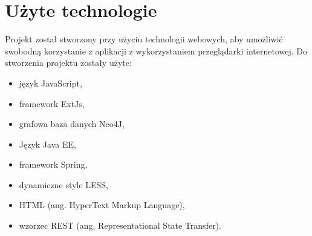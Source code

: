 \section{Użyte technologie}
Projekt został stworzony przy użyciu technologii webowych, aby umożliwić swobodną korzystanie z aplikacji z wykorzystaniem przeglądarki internetowej. Do stworzenia projektu zostały użyte:
\begin{itemize}
\item język JavaScript,
\item framework ExtJs,
\item grafowa baza danych Neo4J,
\item Język Java EE,
\item framework Spring,
\item dynamiczne style LESS,
\item HTML (ang. HyperText Markup Language),
\item wzorzec REST (ang. Representational State Transfer).
\end{itemize}